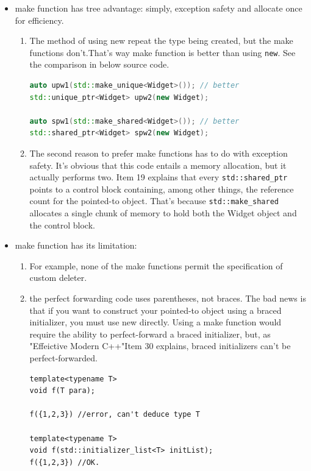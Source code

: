 \documentclass[a4paper,11pt,twoside]{book}
\begin{document}
\begin{itemize}
	\item make function has tree advantage: simply, exception safety and allocate once for efficiency.
	
	\begin{enumerate}
		\item The method of using new repeat the type being created, but the make functions don't.That's way make function is better than using \texttt{new}. See the comparison in below source code. 
\begin{lstlisting}[frame=single, language=c++, mathescape=true]
auto upw1(std::make_unique<Widget>()); // better
std::unique_ptr<Widget> upw2(new Widget); 
		
auto spw1(std::make_shared<Widget>()); // better
std::shared_ptr<Widget> spw2(new Widget); 
\end{lstlisting}
		
		\item The second reason to prefer make functions has to do with exception safety. It's obvious that this code entails a memory allocation, but it actually performs two. Item 19 explains that every \texttt{std::shared\_ptr} points to a control block containing, among other things, the reference count for the pointed-to object. That's because \texttt{std::make\_shared} allocates a single chunk of memory to hold both the Widget object and the control block.
		
	\end{enumerate}
	
	\item make function has its limitation:
	\begin{enumerate}
		\item For example, none of the make functions permit the specification of custom deleter.
		
		\item the perfect forwarding code uses parentheses, not braces. The bad news is that if you want to construct your pointed-to object using a braced initializer, you must use new directly. Using a make function would require the ability to perfect-forward a braced initializer, but, as "Effeictive Modern C++"Item 30 explains, braced initializers can't be perfect-forwarded.
\begin{lstlisting}
template<typename T>
void f(T para);

f({1,2,3}) //error, can't deduce type T

template<typename T>
void f(std::initializer_list<T> initList);
f({1,2,3}) //OK.
\end{lstlisting}


\end{enumerate}
\end{itemize}
\end{document}
